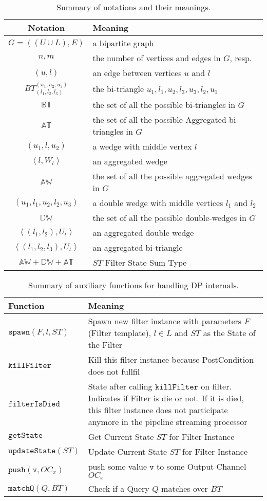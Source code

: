 \documentclass[12pt, a4paper]{article}
\newcommand{\dw}{\mathbb{DW}}
\newcommand{\aw}{\mathbb{AW}}
\newcommand{\bt}{\mathbb{BT}}
\newcommand{\bti}{BT_{(l_1, l_2,l_3)}^{(u_1, u_2, u_3)}}
\newcommand{\at}{\mathbb{AT}}
\newcommand{\st}{ST}
\newcommand{\sw}{\mathtt{spawn}}
\newcommand{\fd}{\mathtt{killFilter}}
\newcommand{\fid}{\mathtt{filterIsDied}}
\newcommand{\us}{\mathtt{updateState}}
\newcommand{\gs}{\mathtt{getState}}
\newcommand{\p}{\mathtt{push}}
\newcommand{\mt}{\mathtt{matchQ}}
\newcommand{\la}{\left\langle}
\newcommand{\ra}{\right\rangle}
\begin{document}
%
\begin{table}[h!]
\centering
\begin{tabular}{|c|l|} \hline
\textbf{Notation} & \textbf{Meaning}\\ \hline
$G=((U\cup L),E)$ & a bipartite graph\\  \hline
$n,m$ & the number of vertices and edges in $G$, resp.\\  \hline
$(u,l)$ & an edge between vertices $u$ and $l$\\  \hline
$\bti$ & the bi-triangle $u_1,l_1,u_2,l_3,u_3,l_2,u_1$\\  \hline
$\bt$ & the set of all the possible bi-triangles in $G$ \\  \hline
$\at$ & the set of all the possible Aggregated bi-triangles in $G$ \\  \hline
$(u_1,l,u_2)$ & a wedge with  middle vertex $l$\\  \hline
$\la l, W_l \ra$ & an aggregated wedge\\  \hline
$\aw$ & the set of all the possible aggregated wedges in $G$\\  \hline
$(u_1,l_1,u_2,l_2,u_3)$ & a double wedge with middle vertices $l_1$ and $l_2$\\  \hline 
$\dw$ & the set of all the possible double-wedges in $G$\\  \hline
$\la (l_1, l_2), U_t \ra$ & an aggregated double wedge\\  \hline
$\la (l_1, l_2,l_3), U_t \ra$ & an aggregated bi-triangle\\  \hline
$\aw + \dw + \at$ & $\st$ Filter State Sum Type\\  \hline
\end{tabular}
\caption{Summary of notations and their meanings.}
\label{table:notation}
\end{table}
%      
\begin{table}[h!]
\centering
\begin{tabular}{|p{0.3\linewidth}|p{0.7\linewidth}|} \hline
\textbf{Function} & \textbf{Meaning}\\ \hline
$\sw(F,l,\st)$ & Spawn new filter instance with parameters $F$ (Filter template), $l \in L$ and $\st$ as the State of the Filter\\\hline
$\fd$ & Kill this filter instance because PostCondition does not fullfil\\ \hline
$\fid$ & State after calling $\fd$ on filter. Indicates if Filter is die or not. If it is died, this filter instance does not participate anymore in the pipeline streaming processor\\ \hline
$\gs$ & Get Current State $\st$ for Filter Instance \\ \hline
$\us(\st)$ & Update Current State $\st$ for Filter Instance \\ \hline
$\p(\mathtt{v}, OC_x)$ & push some value $\mathtt{v}$ to some Output Channel $OC_x$ \\\hline
$\mt(Q, BT)$ & Check if a Query $Q$ matches over $BT$ \\ \hline
\end{tabular}
\caption{Summary of auxiliary functions for handling DP internals.}
\label{table:aux:fn}
\end{table}
\end{document}

